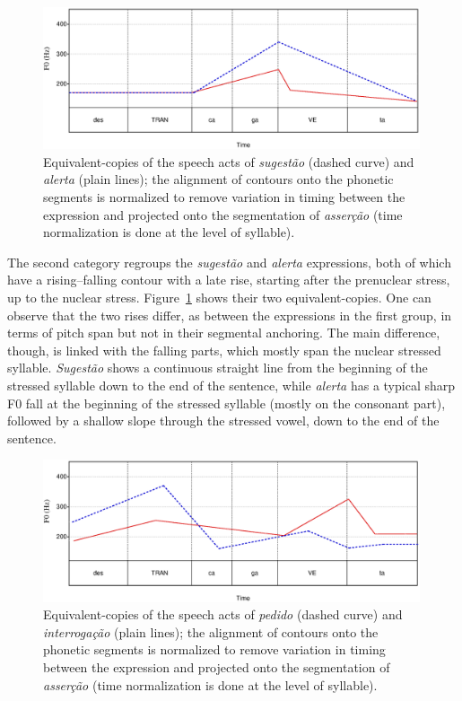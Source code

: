 \documentclass[output=paper]{LSP/langsci}
\begin{document}
\begin{figure}[t]
\includegraphics[width=0.99\textwidth]{figures/MOR11.eps}
\caption{Equivalent-copies of the speech acts of \textit{sugestão} (dashed curve) and \textit{alerta} (plain lines); the alignment of contours onto the phonetic segments is normalized to remove variation in timing between the expression and projected onto the segmentation of \textit{asserção} (time normalization is done at the level of syllable).}
\label{figure:EC2}
\end{figure}

The second category regroups the \textit{sugestão} and \textit{alerta} expressions, both of which have a rising–falling contour with a late rise, starting after the prenuclear stress, up to the nuclear stress. 
Figure~\ref{figure:EC2} shows their two equivalent-copies. 
One can observe that the two rises differ, as between the expressions in the first group, in terms of pitch span but not in their segmental anchoring. 
The main difference, though, is linked with the falling parts, which mostly span the nuclear stressed syllable. 
\textit{Sugestão} shows a continuous straight line from the beginning of the stressed syllable down to the end of the sentence, while \textit{alerta} has a typical sharp F0 fall at the beginning of the stressed syllable (mostly on the consonant part), followed by a shallow slope through the stressed vowel, down to the end of the sentence.


\begin{figure}

\includegraphics[width=0.99\textwidth]{figures/MOR12.eps}
\caption{Equivalent-copies of the speech acts of \textit{pedido} (dashed curve) and \textit{interrogação} (plain lines); the alignment of contours onto the phonetic segments is normalized to remove variation in timing between the expression and projected onto the segmentation of \textit{asserção} (time normalization is done at the level of syllable).}
\label{figure:EC3}
\end{figure}
\end{document}
